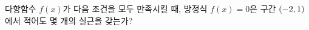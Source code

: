 다항함수 $f(x)$가 다음 조건을 모두 만족시킬 때, 방정식 $f(x)=0$은 구간 $(-2{,}\mkern3mu\mathopen{}1)$에서 적어도 몇 개의 실근을 갖는가? 
